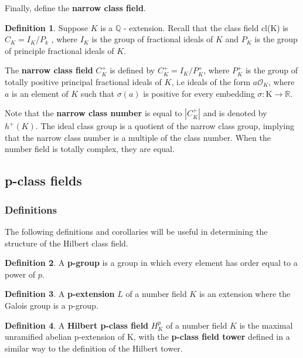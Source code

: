 \documentclass[12pt]{extarticle}
\newcommand{\R}{\mathbb{R}}
\newcommand{\Q}{\mathbb{Q}}
\newcommand{\<}{\langle}
\renewcommand{\>}{\rangle}
\theoremstyle{definition}
\newtheorem*{definition}{Definition}
\begin{document}
Finally, define the \textbf{narrow class field}.
\begin{definition}
Suppose $K$ is a $\Q$ - extension. Recall that the class field cl(K) is $C_K = I_K/P_k$ , where $I_K$ is the group of fractional ideals of $K$ and $P_K$ is the group of principle fractional ideals of $K$. \par

The \textbf{narrow class field} $C_K^{+}$ is defined by $C_K^{+} = I_K/P_K^{+}$, where $P_K^{+}$ is the group of totally positive principal fractional ideals of $K$, i.e ideals of the form $a\mathcal{O}_K$, where $a$ is an element of $K$ such that $\sigma(a)$ is positive for every embedding $\sigma: $K$ \rightarrow \R$. \par
Note that the \textbf{narrow class number} is equal to $|C_K^{+}|$ and is denoted by $h^{+}(K)$. 
  The ideal class group is a quotient of the narrow class group, implying that the narrow class number is a multiple of the class number. When the number field is totally complex, they are equal. 


\end{definition}
\subsection{p-class fields}
\subsubsection*{Definitions}
The following definitions and corollaries will be useful in determining the structure of the Hilbert class field. 
\begin{definition}
A \textbf{p-group} is a group in which every element has order equal to a power of $p$.
\end{definition}
\begin{definition}
A \textbf{p-extension} $L$ of a number field $K$ is an extension where the Galois group is a p-group.
\end{definition}

\begin{definition}
A \textbf{Hilbert p-class field} $H_K^{p}$ of a number field $K$ is the maximal unramified abelian p-extension of K, with the \textbf{p-class field tower} defined in a similar way to the definition of the Hilbert tower. 
\end{definition}
\end{document}
